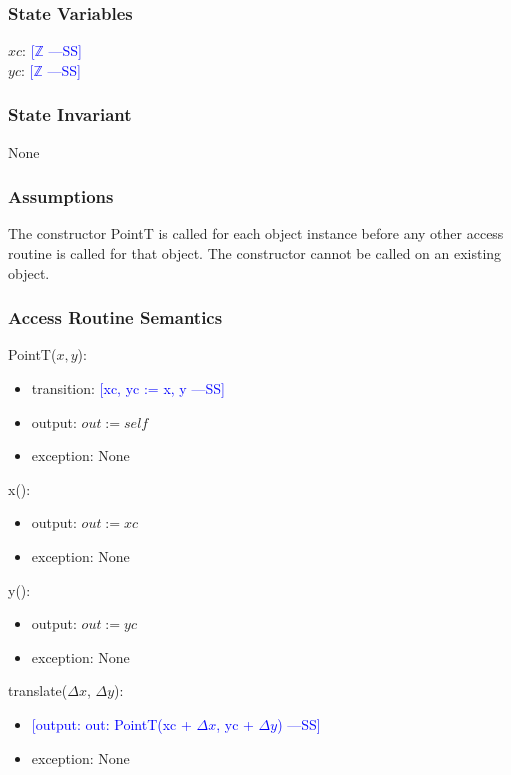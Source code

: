 \documentclass[12pt]{article}
\newcommand{\authornote}[3]{\textcolor{#1}{[#3 ---#2]}}
\newcommand{\authornote}[3]{}
\newcommand{\wss}[1]{\authornote{blue}{SS}{#1}}
\begin{document}
\subsubsection* {State Variables}

$xc$: \wss{$\mathbb{Z}$}\\
$yc$: \wss{$\mathbb{Z}$}

\subsubsection* {State Invariant}

None

\subsubsection* {Assumptions}

The constructor PointT is called for each object instance before any other
access routine is called for that object.  The constructor cannot be called on
an existing object.

\subsubsection* {Access Routine Semantics}

PointT($x, y$):
\begin{itemize}
\item transition: \wss{xc, yc := x, y}
\item output: $out := \mathit{self}$
\item exception: None
\end{itemize}

\noindent x():
\begin{itemize}
\item output: $out := xc$
\item exception: None
\end{itemize}

\noindent y():
\begin{itemize}
\item output: $out := yc$
\item exception: None
\end{itemize}

\noindent translate($\Delta x$, $\Delta y$):
\begin{itemize}
\item \wss{output: out: PointT(xc + $\Delta x$, yc + $\Delta y$)}
\item exception: None
\end{itemize}
\end{document}
